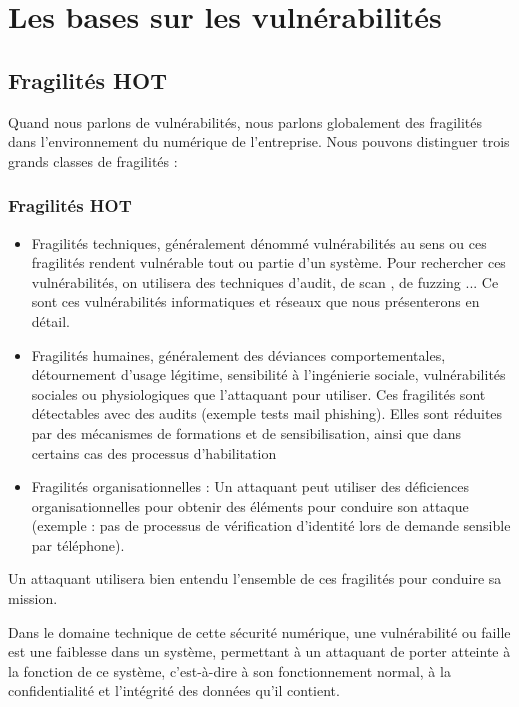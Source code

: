 \section{Les bases sur les vulnérabilités}

\subsection{Fragilités HOT}

Quand nous parlons de vulnérabilités, nous parlons globalement des fragilités dans l’environnement du numérique de l’entreprise. Nous pouvons distinguer trois grands classes de fragilités :

\begin{frame}
\frametitle<presentation>{Fragilités HOT}
\begin{itemize}
\item Fragilités techniques, généralement dénommé vulnérabilités au sens ou ces fragilités rendent vulnérable tout ou partie d’un système. Pour rechercher ces vulnérabilités, on utilisera des techniques d’audit, de scan , de fuzzing ... Ce sont ces vulnérabilités informatiques et réseaux que nous présenterons en détail.
\item Fragilités humaines, généralement des déviances comportementales, détournement d’usage légitime, sensibilité à l’ingénierie sociale, vulnérabilités sociales ou physiologiques que l’attaquant pour utiliser. Ces fragilités sont détectables avec des audits (exemple tests mail phishing). Elles sont réduites par des mécanismes de formations et de sensibilisation, ainsi que dans certains cas des processus d’habilitation 
\item Fragilités organisationnelles : Un attaquant peut utiliser des déficiences organisationnelles pour obtenir des éléments pour conduire son attaque (exemple : pas de processus de vérification d’identité lors de demande sensible par téléphone).
\end{itemize}
\end{frame}

Un attaquant utilisera bien entendu l’ensemble de ces fragilités pour conduire sa mission.


Dans le domaine technique de cette sécurité numérique, une vulnérabilité ou faille est une faiblesse dans un système, permettant à un attaquant de porter atteinte à la fonction de ce système, c'est-à-dire à son fonctionnement normal, à la confidentialité et l'intégrité des données qu'il contient.

